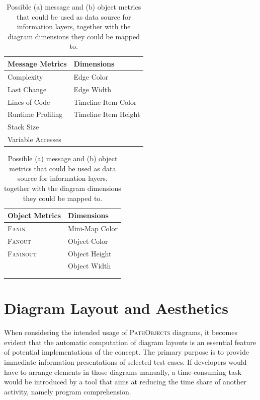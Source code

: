 \begin{table}[tb]
	\centering
	\footnotesize
	\begin{subtable}[t]{0.45\textwidth}
		\begin{tabular}{ll}
		\toprule[1.2pt]
		Message Metrics		& Dimensions 			\\
		\midrule
		Complexity			& Edge Color 			\\
		Last Change			& Edge Width			\\
		Lines of Code		& Timeline Item Color	\\
		Runtime Profiling	& Timeline Item Height	\\
		Stack Size			&						\\
		Variable Accesses	&						\\
		\bottomrule[1.2pt]
		\end{tabular}
		\caption[Message Metrics]{}
	\end{subtable}
	\qquad
	\begin{subtable}[t]{0.45\textwidth}
		\begin{tabular}{ll}
		\toprule[1.2pt]
		Object Metrics		& Dimensions 			\\
		\midrule
		\textsc{Fanin}		& Mini-Map Color		\\
		\textsc{Fanout}		& Object Color			\\
		\textsc{Faninout}	& Object Height			\\
		\hphantom{Runtime Profiling}	& Object Width			\\
							& \hphantom{Timeline Item Height} \\
							& \\
		\bottomrule[1.2pt]
		\end{tabular}
		\caption[Object Metrics]{}
	\end{subtable}
	\caption[Information Layers: Possible Metrics and Diagram Dimensions]{Possible (a) message and (b) object metrics that could be used as data source for information layers, together with the diagram dimensions they could be mapped to.}
	\label{t:ApproachLayers}
\end{table}


\section[Diagram Layout and Aesthetics]{Diagram Layout and Aesthetics%
}
\label{s:ApproachLayout}
When considering the intended usage of \textsc{PathObjects} diagrams, it becomes evident that the automatic computation of diagram layouts is an essential feature of potential implementations of the concept.
The primary purpose is to provide immediate information presentations of selected test cases.
If developers would have to arrange elements in those diagrams manually, a time-consuming task would be introduced by a tool that aims at reducing the time share of another activity, namely program comprehension.

